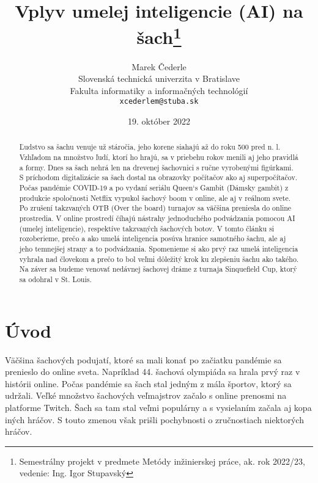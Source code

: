 \documentclass[10pt,oneside,slovak,a4paper]{article}
\title{Vplyv umelej inteligencie (AI) na šach\thanks{Semestrálny projekt v predmete Metódy inžinierskej práce, ak. rok 2022/23, vedenie: Ing. Igor Stupavský }} %
\author{Marek Čederle\\[2pt]
	{\small Slovenská technická univerzita v Bratislave}\\
	{\small Fakulta informatiky a informačných technológií}\\
	{\small \texttt{xcederlem@stuba.sk}}
	}
\date{\small 19. október 2022}
\begin{document}
\maketitle

\begin{abstract}
Ľudstvo sa šachu venuje už stáročia, jeho korene siahajú až do roku 500 pred n. l. Vzhľadom na množstvo ľudí, ktorí ho hrajú, sa v priebehu rokov menili aj jeho pravidlá a formy. Dnes sa šach nehrá len na drevenej šachovnici s ručne vyrobenými figúrkami. S príchodom digitalizácie sa šach dostal na  obrazovky počítačov ako aj superpočítačov. Počas pandémie COVID-19 a po vydaní seriálu Queen‘s Gambit (Dámsky gambit) z produkcie spoločnosti Netflix vypukol šachový boom v online, ale aj v reálnom svete. Po zrušení takzvaných OTB (Over the board) turnajov sa väčšina preniesla do online prostredia. V online prostredí číhajú nástrahy jednoduchého podvádzania pomocou AI (umelej inteligencie), respektíve takzvaných šachových botov. V tomto článku si rozoberieme, prečo a ako umelá inteligencia posúva hranice samotného šachu, ale aj jeho temnejšej strany a to podvádzania. Spomenieme si ako prvý raz umelá inteligencia vyhrala nad človekom a prečo to bol veľmi dôležitý krok ku zlepšeniu šachu ako takého. Na záver sa budeme venovať nedávnej šachovej dráme z turnaja Sinquefield Cup, ktorý sa odohral v St. Louis.
\end{abstract}





\section{Úvod}

Väčšina šachových podujatí, ktoré sa mali konať po začiatku pandémie sa prenieslo do online sveta. Napríklad 44. šachová olympiáda sa hrala prvý raz v histórii online. Počas pandémie sa šach stal jedným z mála športov, ktorý sa udržali. Veľké množstvo šachových veľmajstrov začalo s online prenosmi na platforme Twitch. Šach sa tam stal veľmi populárny a s vysielaním začala aj kopa iných hráčov. S touto zmenou však  prišli pochybnosti o zručnostiach niektorých hráčov. 

\cite{IM20}



\end{document}
